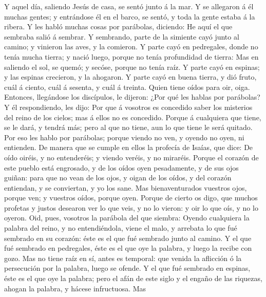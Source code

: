  Y aquel día, saliendo Jesús de casa, se sentó junto á la
mar.  Y se allegaron á él muchas gentes; y entrándose él
en el barco, se sentó, y toda la gente estaba á la ribera.
 Y les habló muchas cosas por parábolas, diciendo: He aquí
el que sembraba salió á sembrar.  Y sembrando, parte de la
simiente cayó junto al camino; y vinieron las aves, y la comieron.
 Y parte cayó en pedregales, donde no tenía mucha tierra;
y nació luego, porque no tenía profundidad de tierra:  Mas
en saliendo el sol, se quemó; y secóse, porque no tenía raíz.
 Y parte cayó en espinas; y las espinas crecieron, y la
ahogaron.  Y parte cayó en buena tierra, y dió fruto, cuál
á ciento, cuál á sesenta, y cuál á treinta.  Quien tiene
oídos para oir, oiga.  Entonces, llegándose los
discípulos, le dijeron: ¿Por qué les hablas por parábolas?
 Y él respondiendo, les dijo: Por que á vosotros es
concedido saber los misterios del reino de los cielos; mas á ellos no es
concedido.  Porque á cualquiera que tiene, se le dará, y
tendrá más; pero al que no tiene, aun lo que tiene le será quitado.
 Por eso les hablo por parábolas; porque viendo no ven, y
oyendo no oyen, ni entienden.  De manera que se cumple en
ellos la profecía de Isaías, que dice: De oído oiréis, y no entenderéis;
y viendo veréis, y no miraréis.  Porque el corazón de
este pueblo está engrosado, y de los oídos oyen pesadamente, y de sus
ojos guiñan: para que no vean de los ojos, y oigan de los oídos, y del
corazón entiendan, y se conviertan, y yo los sane.  Mas
bienaventurados vuestros ojos, porque ven; y vuestros oídos, porque
oyen.  Porque de cierto os digo, que muchos profetas y
justos desearon ver lo que veis, y no lo vieron: y oir lo que oís, y no
lo oyeron.  Oid, pues, vosotros la parábola del que
siembra:  Oyendo cualquiera la palabra del reino, y no
entendiéndola, viene el malo, y arrebata lo que fué sembrado en su
corazón: éste es el que fué sembrado junto al camino.  Y
el que fué sembrado en pedregales, éste es el que oye la palabra, y
luego la recibe con gozo.  Mas no tiene raíz en sí, antes
es temporal: que venida la aflicción ó la persecución por la palabra,
luego se ofende.  Y el que fué sembrado en espinas, éste
es el que oye la palabra; pero el afán de este siglo y el engaño de las
riquezas, ahogan la palabra, y hácese infructuosa.  Mas
